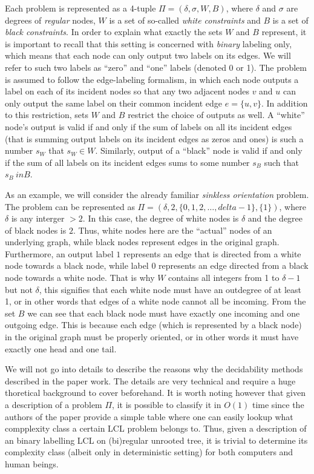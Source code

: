 Each problem is represented as a 4-tuple $\Pi = (\delta, \sigma, W, B)$, where
$\delta$ and $\sigma$ are degrees of \emph{regular} nodes, $W$ is a set of so-called
\emph{white constraints} and $B$ is a set of \emph{black constraints}. In order to
explain what exactly the sets $W$ and $B$ represent, it is important to recall that
this setting is concerned with \emph{binary} labeling only, which means that each node
can only output two labels on its edges. We will refer to such two labels as ``zero'' and ``one''
labels (denoted 0 or 1). The problem is assumed to follow the edge-labeling
formalism, in which each node outputs a label on each of its incident nodes so that
any two adjacent nodes $v$ and $u$ can only output the same label on their common
incident edge $e = \{u, v\}$. In addition to this restriction, sets $W$ and $B$
restrict the choice of outputs as well. A ``white'' node's output is valid
if and only if the sum of labels on all its incident edges (that is summing
output labels on its incident edges as zeros and ones) is such a number $s_W$ that
$s_W \in W$. Similarly, output of a ``black'' node is valid if and only if
the sum of all labels on its incident edges sums to some number $s_B$ such that
$s_B \ in B$.

As an example, we will consider the already familiar \emph{sinkless orientation}
problem. The problem can be represented as $\Pi = (\delta, 2, \{0, 1, 2, \dots, delta-1\}, \{ 1 \})$,
where $\delta$ is any interger $> 2$. In this case, the degree of white nodes is
$\delta$ and the degree of black nodes is $2$. Thus, white nodes here are the ``actual''
nodes of an underlying graph, while black nodes represent edges in the original graph.
Furthermore, an output label $1$ represents an edge
that is directed from a white node towards a black node, while label $0$ represents
an edge directed from a black node towards a white node. That is why
$W$ contains all integers from 1 to $\delta - 1$ but not $\delta$,
this signifies that each white node must have an outdegree of at least 1,
or in other words that edges of a white node cannot all be incoming.
From the set $B$ we can see that each black node must have 
exactly one incoming and one outgoing edge. This is because each edge (which is represented by a black node)
in the original graph must be properly oriented, or in other words it must
have exactly one head and one tail.

We will not go into details to describe the reasons why the decidability methods
described in the paper work. The details are very technical and require a huge
thoretical background to cover beforehand. It is worth noting however that
given a description of a problem $\Pi$, it is possible to classify it in $O(1)$
time since the authors of the paper provide a simple table where one can
easily lookup what compplexity class a certain LCL problem belongs to. Thus,
given a description of an binary labelling LCL on (bi)regular unrooted tree,
it is trivial to determine its complexity class (albeit only in deterministic setting)
for both computers and human beings.

